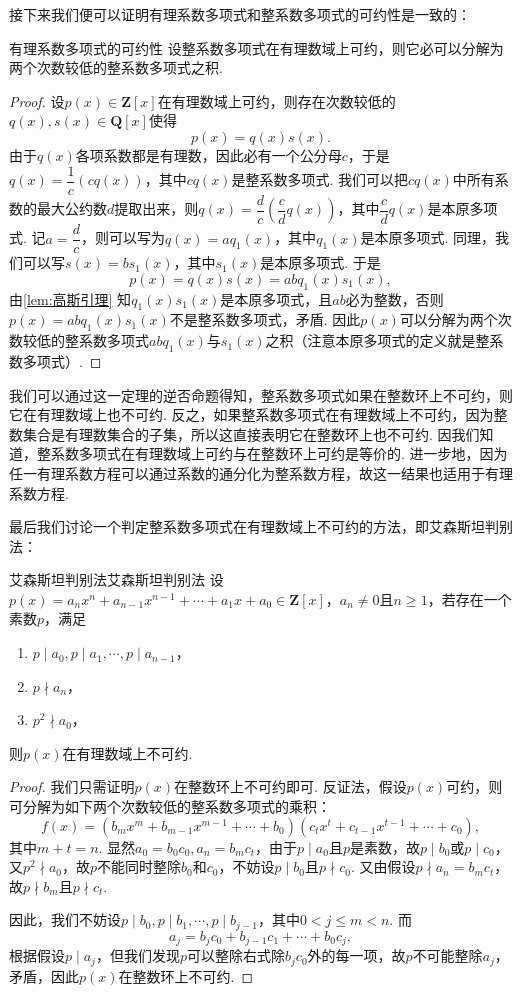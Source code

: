 接下来我们便可以证明有理系数多项式和整系数多项式的可约性是一致的：
\begin{theorem}{}{有理系数多项式的可约性}
    设整系数多项式在有理数域上可约，则它必可以分解为两个次数较低的整系数多项式之积.
\end{theorem}
\begin{proof}
    设$p(x)\in\mathbf{Z}[x]$在有理数域上可约，则存在次数较低的$q(x),s(x)\in\mathbf{Q}[x]$使得
    \[p(x)=q(x)s(x).\]
    由于$q(x)$各项系数都是有理数，因此必有一个公分母$c$，于是$q(x)=\dfrac{1}{c}(cq(x))$，其中$cq(x)$是整系数多项式. 我们可以把$cq(x)$中所有系数的最大公约数$d$提取出来，则$q(x)=\dfrac{d}{c}(\dfrac{c}{d}q(x))$，其中$\dfrac{c}{d}q(x)$是本原多项式. 记$a=\dfrac{d}{c}$，则可以写为$q(x)=aq_1(x)$，其中$q_1(x)$是本原多项式. 同理，我们可以写$s(x)=bs_1(x)$，其中$s_1(x)$是本原多项式. 于是
    \[p(x)=q(x)s(x)=abq_1(x)s_1(x),\]
    由\autoref{lem:高斯引理} 知$q_1(x)s_1(x)$是本原多项式，且$ab$必为整数，否则$p(x)=abq_1(x)s_1(x)$不是整系数多项式，矛盾. 因此$p(x)$可以分解为两个次数较低的整系数多项式$abq_1(x)$与$s_1(x)$之积（注意本原多项式的定义就是整系数多项式）.
\end{proof}

我们可以通过这一定理的逆否命题得知，整系数多项式如果在整数环上不可约，则它在有理数域上也不可约. 反之，如果整系数多项式在有理数域上不可约，因为整数集合是有理数集合的子集，所以这直接表明它在整数环上也不可约. 因我们知道，整系数多项式在有理数域上可约与在整数环上可约是等价的. 进一步地，因为任一有理系数方程可以通过系数的通分化为整系数方程，故这一结果也适用于有理系数方程.

最后我们讨论一个判定整系数多项式在有理数域上不可约的方法，即艾森斯坦判别法：
\begin{theorem}{艾森斯坦判别法}{艾森斯坦判别法}
    设$p(x)=a_nx^n+a_{n-1}x^{n-1}+\cdots+a_1x+a_0\in\mathbf{Z}[x]$，$a_n\neq 0$且$n\geqslant 1$，若存在一个素数$p$，满足
    \begin{enumerate}
        \item $p\mid a_0,p\mid a_1,\cdots,p\mid a_{n-1}$，
        \item $p\nmid a_n$，
        \item $p^2\nmid a_0$，
    \end{enumerate}
    则$p(x)$在有理数域上不可约.
\end{theorem}
\begin{proof}
    我们只需证明$p(x)$在整数环上不可约即可. 反证法，假设$p(x)$可约，则可分解为如下两个次数较低的整系数多项式的乘积：
    \[f(x)=(b_mx^m+b_{m-1}x^{m-1}+\cdots+b_0)(c_tx^t+c_{t-1}x^{t-1}+\cdots+c_0),\]
    其中$m+t=n$. 显然$a_0=b_0c_0,a_n=b_mc_t$，由于$p\mid a_0$且$p$是素数，故$p\mid b_0$或$p\mid c_0$，又$p^2\nmid a_0$，故$p$不能同时整除$b_0$和$c_0$，不妨设$p\mid b_0$且$p\nmid c_0$. 又由假设$p\nmid a_n=b_mc_t$，故$p\nmid b_m$且$p\nmid c_t$.

    因此，我们不妨设$p\mid b_0,p\mid b_1,\cdots,p\mid b_{j-1}$，其中$0<j\leqslant m<n$. 而
    \[a_j=b_jc_0+b_{j-1}c_1+\cdots+b_0c_j,\]
    根据假设$p\mid a_j$，但我们发现$p$可以整除右式除$b_jc_0$外的每一项，故$p$不可能整除$a_j$，矛盾，因此$p(x)$在整数环上不可约.
\end{proof}

